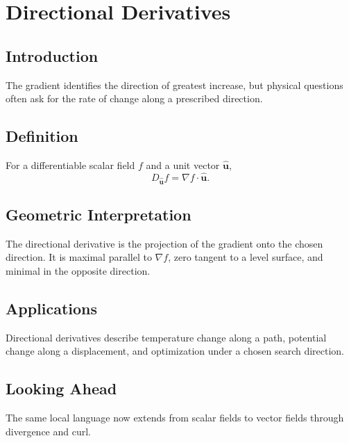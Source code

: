 \section{Directional Derivatives}
\label{sec:directional-derivatives}
\subsection{Introduction}
The gradient identifies the direction of greatest increase, but physical questions often ask for the rate of change along a prescribed direction.
\subsection{Definition}
For a differentiable scalar field $f$ and a unit vector $\hat{\mathbf u}$,
\[
D_{\hat{\mathbf u}}f=\nabla f\cdot\hat{\mathbf u}.
\]
\subsection{Geometric Interpretation}
The directional derivative is the projection of the gradient onto the chosen direction. It is maximal parallel to $\nabla f$, zero tangent to a level surface, and minimal in the opposite direction.
\subsection{Applications}
Directional derivatives describe temperature change along a path, potential change along a displacement, and optimization under a chosen search direction.
\subsection{Looking Ahead}
The same local language now extends from scalar fields to vector fields through divergence and curl.
